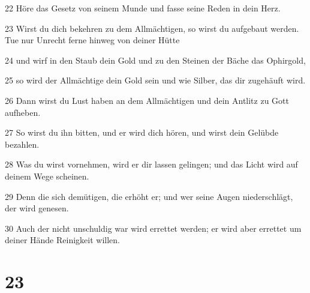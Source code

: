\par 22 Höre das Gesetz von seinem Munde und fasse seine Reden in dein Herz.
\par 23 Wirst du dich bekehren zu dem Allmächtigen, so wirst du aufgebaut werden. Tue nur Unrecht ferne hinweg von deiner Hütte
\par 24 und wirf in den Staub dein Gold und zu den Steinen der Bäche das Ophirgold,
\par 25 so wird der Allmächtige dein Gold sein und wie Silber, das dir zugehäuft wird.
\par 26 Dann wirst du Lust haben an dem Allmächtigen und dein Antlitz zu Gott aufheben.
\par 27 So wirst du ihn bitten, und er wird dich hören, und wirst dein Gelübde bezahlen.
\par 28 Was du wirst vornehmen, wird er dir lassen gelingen; und das Licht wird auf deinem Wege scheinen.
\par 29 Denn die sich demütigen, die erhöht er; und wer seine Augen niederschlägt, der wird genesen.
\par 30 Auch der nicht unschuldig war wird errettet werden; er wird aber errettet um deiner Hände Reinigkeit willen.

\chapter{23}


